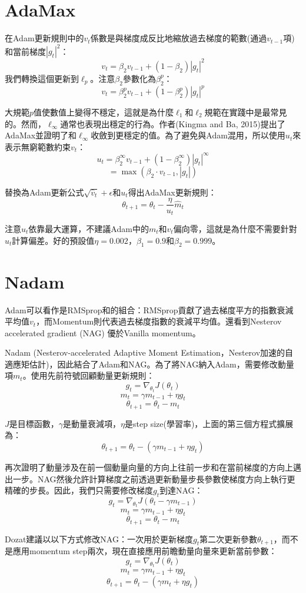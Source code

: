 \documentclass[13pt, a4paper]{report}
\begin{document}
\section{AdaMax}
在Adam更新規則中的$v_t$係數是與梯度成反比地縮放過去梯度的範數(通過$v_{t-1}$項)和當前梯度$|g_t|^2$：
$$v_t = \beta_2 v_{t-1} + (1 - \beta_2) |g_t|^2$$
我們轉換這個更新到$\ell_p$。注意$\beta_2$參數化為$\beta_2^p$：
$$v_t = \beta_2^p v_{t-1} + (1 - \beta_2^p) |g_t|^p$$

大規範$p$值使數值上變得不穩定，這就是為什麼$\ell_1$和$\ell_2$規範在實踐中是最常見的。然而，$\ell_\infty$通常也表現出穩定的行為。作者(Kingma and Ba, 2015)提出了AdaMax並證明了和$\ell_\infty$收斂到更穩定的值。為了避免與Adam混用，所以使用$u_t$來表示無窮範數約束$v_t$：
$$u_t = \beta_2^\infty v_{t-1} + (1 - \beta_2^\infty) |g_t|^\infty$$
$$ = \max(\beta_2 \cdot v_{t-1}, |g_t|) $$

替換為Adam更新公式$\sqrt{\hat{v}_t} + \epsilon$和$u_t$得出AdaMax更新規則：
$$\theta_{t+1} = \theta_{t} - \dfrac{\eta}{u_t} \hat{m}_t$$

注意$u_t$依靠最大運算，不建議Adam中的$m_t$和$v_t$偏向零，這就是為什麼不需要針對$u_t$計算偏差。好的預設值$\eta=0.002$，$\beta_1=0.9$和$\beta_2=0.999$。
\section{Nadam}
Adam可以看作是RMSprop和的組合：RMSprop貢獻了過去梯度平方的指數衰減平均值$v_t$，而Momentum則代表過去梯度指數的衰減平均值。還看到Nesterov accelerated gradient (NAG) 優於Vanilla momentum。

Nadam (Nesterov-accelerated Adaptive Moment Estimation，Nesterov加速的自適應矩估計)，因此結合了Adam和NAG。為了將NAG納入Adam，需要修改動量項$m_t$。使用先前符號回顧動量更新規則：
$$g_t = \nabla_{\theta_t}J(\theta_t)$$
$$m_t = \gamma m_{t-1} + \eta g_t$$
$$\theta_{t+1} = \theta_t - m_t $$

$J$是目標函數，$\gamma$是動量衰減項，$\eta$是step size(學習率)，上面的第三個方程式擴展為：
$$\theta_{t+1} = \theta_t - ( \gamma m_{t-1} + \eta g_t)$$

再次證明了動量涉及在前一個動量向量的方向上往前一步和在當前梯度的方向上邁出一步。NAG然後允許計算梯度之前透過更新動量步長參數使梯度方向上執行更精確的步長。因此，我們只需要修改梯度$g_t$到達NAG：
$$g_t = \nabla_{\theta_t}J(\theta_t - \gamma m_{t-1})$$ 
$$m_t = \gamma m_{t-1} + \eta g_t$$
$$\theta_{t+1} = \theta_t - m_t$$

Dozat建議以以下方式修改NAG：一次用於更新梯度$g_t$第二次更新參數$\theta_{t+1}$，而不是應用momentum step兩次，現在直接應用前瞻動量向量來更新當前參數：
$$g_t = \nabla_{\theta_t}J(\theta_t)$$
$$m_t = \gamma m_{t-1} + \eta g_t$$
$$\theta_{t+1} = \theta_t - (\gamma m_t + \eta g_t)$$
\end{document}
